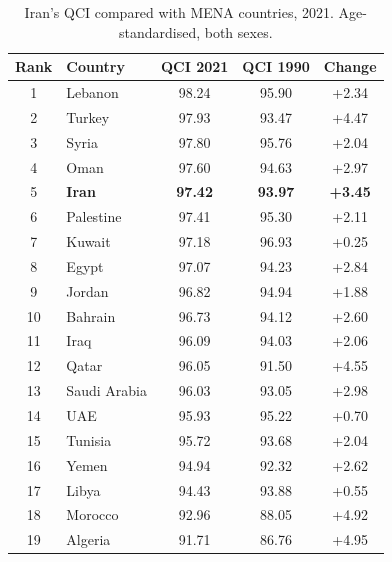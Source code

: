 \documentclass[12pt]{article}
\begin{document}
\clearpage

\begin{table}[htbp]
\centering
\caption{Iran's QCI compared with MENA countries, 2021. Age-standardised, both sexes.}
\label{tab:table5}
\begin{tabular}{clccc}
\toprule
Rank & Country & QCI 2021 & QCI 1990 & Change \\
\midrule
1 & Lebanon & 98.24 & 95.90 & +2.34 \\
2 & Turkey & 97.93 & 93.47 & +4.47 \\
3 & Syria & 97.80 & 95.76 & +2.04 \\
4 & Oman & 97.60 & 94.63 & +2.97 \\
5 & \textbf{Iran} & \textbf{97.42} & \textbf{93.97} & \textbf{+3.45} \\
6 & Palestine & 97.41 & 95.30 & +2.11 \\
7 & Kuwait & 97.18 & 96.93 & +0.25 \\
8 & Egypt & 97.07 & 94.23 & +2.84 \\
9 & Jordan & 96.82 & 94.94 & +1.88 \\
10 & Bahrain & 96.73 & 94.12 & +2.60 \\
11 & Iraq & 96.09 & 94.03 & +2.06 \\
12 & Qatar & 96.05 & 91.50 & +4.55 \\
13 & Saudi Arabia & 96.03 & 93.05 & +2.98 \\
14 & UAE & 95.93 & 95.22 & +0.70 \\
15 & Tunisia & 95.72 & 93.68 & +2.04 \\
16 & Yemen & 94.94 & 92.32 & +2.62 \\
17 & Libya & 94.43 & 93.88 & +0.55 \\
18 & Morocco & 92.96 & 88.05 & +4.92 \\
19 & Algeria & 91.71 & 86.76 & +4.95 \\
\bottomrule
\end{tabular}
\end{table}

\clearpage
\end{document}
